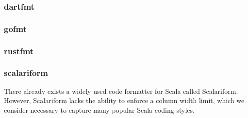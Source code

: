 \subsubsection{dartfmt}
\subsubsection{gofmt}
\subsubsection{rustfmt}
\subsubsection{scalariform}
There already exists a widely used code formatter for Scala called Scalariform\autocite{scalariform}.
However, Scalariform lacks the ability to enforce a column width limit,
which we consider necessary to capture many popular Scala coding styles.
